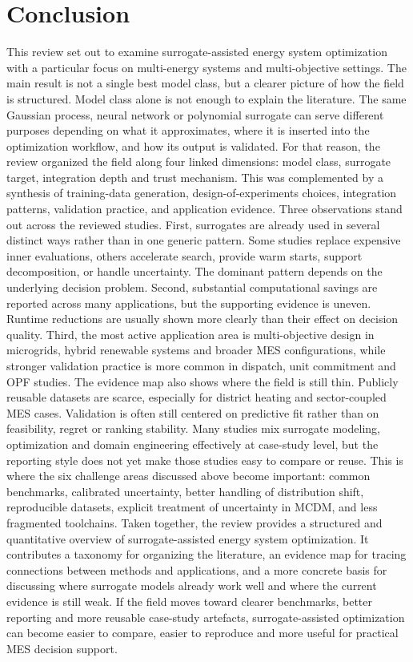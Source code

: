 \documentclass[final,5p,times,twocolumn]{elsarticle}
\begin{document}
\section{Conclusion}
\label{sec:conclusion}
This review set out to examine surrogate-assisted energy system
optimization with a particular focus on multi-energy systems and
multi-objective settings. The main result is not a single best model
class, but a clearer picture of how the field is structured. Model class
alone is not enough to explain the literature. The same Gaussian
process, neural network or polynomial surrogate can serve different
purposes depending on what it approximates, where it is inserted into
the optimization workflow, and how its output is validated. For that
reason, the review organized the field along four linked dimensions:
model class, surrogate target, integration depth and trust mechanism.
This was complemented by a synthesis of training-data generation,
design-of-experiments choices, integration patterns, validation
practice, and application evidence.
Three observations stand out across the reviewed studies. First,
surrogates are already used in several distinct ways rather than in one
generic pattern. Some studies replace expensive inner evaluations,
others accelerate search, provide warm starts, support decomposition, or
handle uncertainty. The dominant pattern depends on the underlying
decision problem. Second, substantial computational savings are reported
across many applications, but the supporting evidence is uneven. Runtime
reductions are usually shown more clearly than their effect on decision
quality. Third, the most active application area is multi-objective
design in microgrids, hybrid renewable systems and broader MES
configurations, while stronger validation practice is more common in
dispatch, unit commitment and OPF studies.
The evidence map also shows where the field is still thin. Publicly
reusable datasets are scarce, especially for district heating and
sector-coupled MES cases. Validation is often still centered on
predictive fit rather than on feasibility, regret or ranking stability.
Many studies mix surrogate modeling, optimization and domain
engineering effectively at case-study level, but the reporting style
does not yet make those studies easy to compare or reuse. This is where
the six challenge areas discussed above become important: common
benchmarks, calibrated uncertainty, better handling of distribution
shift, reproducible datasets, explicit treatment of uncertainty in MCDM,
and less fragmented toolchains.
Taken together, the review provides a structured and quantitative
overview of surrogate-assisted energy system optimization. It contributes
a taxonomy for organizing the literature, an evidence map for tracing
connections between methods and applications, and a more concrete basis
for discussing where surrogate models already work well and where the
current evidence is still weak. If the field moves toward clearer
benchmarks, better reporting and more reusable case-study artefacts,
surrogate-assisted optimization can become easier to compare, easier to
reproduce and more useful for practical MES decision support.




\end{document}
